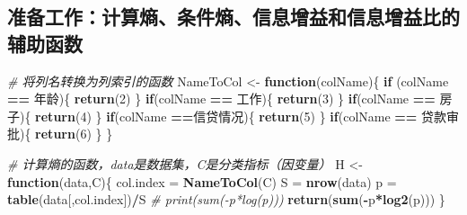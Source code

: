 \documentclass[
]{ctexart}
\newenvironment{Shaded}{\begin{snugshade}}{\end{snugshade}}
\newcommand{\CommentTok}[1]{\textcolor[rgb]{0.56,0.35,0.01}{\textit{#1}}}
\newcommand{\ControlFlowTok}[1]{\textcolor[rgb]{0.13,0.29,0.53}{\textbf{#1}}}
\newcommand{\DecValTok}[1]{\textcolor[rgb]{0.00,0.00,0.81}{#1}}
\newcommand{\FunctionTok}[1]{\textcolor[rgb]{0.13,0.29,0.53}{\textbf{#1}}}
\newcommand{\NormalTok}[1]{#1}
\newcommand{\OtherTok}[1]{\textcolor[rgb]{0.56,0.35,0.01}{#1}}
\newcommand{\SpecialCharTok}[1]{\textcolor[rgb]{0.81,0.36,0.00}{\textbf{#1}}}
\newcommand{\StringTok}[1]{\textcolor[rgb]{0.31,0.60,0.02}{#1}}
\begin{document}
\hypertarget{ux51c6ux5907ux5de5ux4f5cux8ba1ux7b97ux71b5ux6761ux4ef6ux71b5ux4fe1ux606fux589eux76caux548cux4fe1ux606fux589eux76caux6bd4ux7684ux8f85ux52a9ux51fdux6570}{%
\subsection{准备工作：计算熵、条件熵、信息增益和信息增益比的辅助函数}\label{ux51c6ux5907ux5de5ux4f5cux8ba1ux7b97ux71b5ux6761ux4ef6ux71b5ux4fe1ux606fux589eux76caux548cux4fe1ux606fux589eux76caux6bd4ux7684ux8f85ux52a9ux51fdux6570}}

\begin{Shaded}
\begin{Highlighting}[]
\CommentTok{\# 将列名转换为列索引的函数}
\NormalTok{NameToCol }\OtherTok{\textless{}{-}} \ControlFlowTok{function}\NormalTok{(colName)\{}
  \ControlFlowTok{if}\NormalTok{ (colName }\SpecialCharTok{==} \StringTok{\textquotesingle{}年龄\textquotesingle{}}\NormalTok{)\{}
    \FunctionTok{return}\NormalTok{(}\DecValTok{2}\NormalTok{)}
\NormalTok{  \}}
  \ControlFlowTok{if}\NormalTok{(colName }\SpecialCharTok{==} \StringTok{\textquotesingle{}工作\textquotesingle{}}\NormalTok{)\{}
    \FunctionTok{return}\NormalTok{(}\DecValTok{3}\NormalTok{)}
\NormalTok{  \}}
  \ControlFlowTok{if}\NormalTok{(colName }\SpecialCharTok{==} \StringTok{\textquotesingle{}房子\textquotesingle{}}\NormalTok{)\{}
    \FunctionTok{return}\NormalTok{(}\DecValTok{4}\NormalTok{)}
\NormalTok{  \}}
  \ControlFlowTok{if}\NormalTok{(colName }\SpecialCharTok{==}\StringTok{\textquotesingle{}信贷情况\textquotesingle{}}\NormalTok{)\{}
    \FunctionTok{return}\NormalTok{(}\DecValTok{5}\NormalTok{)}
\NormalTok{  \}}
  \ControlFlowTok{if}\NormalTok{(colName }\SpecialCharTok{==} \StringTok{\textquotesingle{}贷款审批\textquotesingle{}}\NormalTok{)\{}
    \FunctionTok{return}\NormalTok{(}\DecValTok{6}\NormalTok{)}
\NormalTok{  \}}
\NormalTok{\}}

\CommentTok{\# 计算熵的函数，data是数据集，C是分类指标（因变量）}
\NormalTok{H }\OtherTok{\textless{}{-}} \ControlFlowTok{function}\NormalTok{(data,C)\{}
\NormalTok{  col.index }\OtherTok{=} \FunctionTok{NameToCol}\NormalTok{(C)}
\NormalTok{  S }\OtherTok{=} \FunctionTok{nrow}\NormalTok{(data)}
\NormalTok{  p }\OtherTok{=} \FunctionTok{table}\NormalTok{(data[,col.index])}\SpecialCharTok{/}\NormalTok{S}
  \CommentTok{\# print(sum({-}p*log(p)))}
  \FunctionTok{return}\NormalTok{(}\FunctionTok{sum}\NormalTok{(}\SpecialCharTok{{-}}\NormalTok{p}\SpecialCharTok{*}\FunctionTok{log2}\NormalTok{(p)))}
\NormalTok{\}}


\end{Highlighting}
\end{Shaded}
\end{document}
